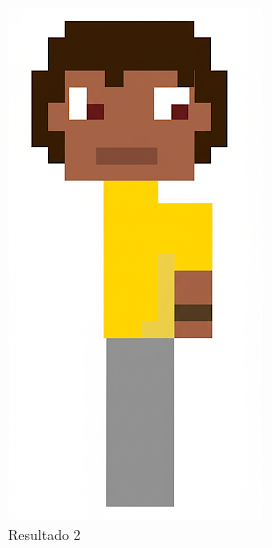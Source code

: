 \begin{figure}[htbp]
\begin{subfigure}{0.23\linewidth}
        \includegraphics[width=1\linewidth]{figs/geminiPro/chat2/res2_tela2.png}
        \caption{\small Resultado 2}
        \label{fig:geminiPro5b}
    \end{subfigure}
    \begin{subfigure}{0.23\linewidth}

\end{subfigure}
\end{figure}
